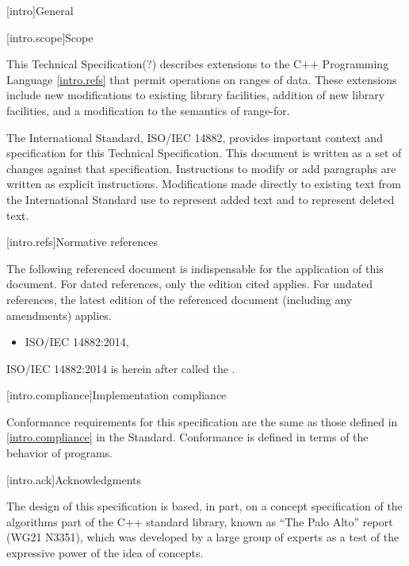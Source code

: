 
[intro]{General}

[intro.scope]{Scope}

\pnum
This Technical Specification(?) describes extensions to the C++
Programming Language \ref{intro.refs} that
permit operations on ranges of data. These extensions include
new modifications to existing library facilities, addition of
new library facilities, and a modification to the semantics of
range-for.

\pnum
The International Standard, ISO/IEC 14882, provides important context
and specification for this Technical Specification. This document is
written as a set of changes against that specification. Instructions
to modify or add paragraphs are written as explicit instructions.
Modifications made directly to existing text from the International
Standard use  to represent added text and
 to represent deleted text.


[intro.refs]{Normative references}

\pnum
The following referenced document is indispensable for the
application of this document. For dated references, only the
edition cited applies. For undated references, the latest edition
of the referenced document (including any amendments) applies.

\begin{itemize}
\item ISO/IEC 14882:2014, 
\end{itemize}

ISO/IEC 14882:2014 is herein after called the .

[intro.compliance]{Implementation compliance}

\pnum
Conformance requirements for this specification are the same as those
defined in \ref{intro.compliance} in the \Cpp Standard.
\enternote
Conformance is defined in terms of the behavior of programs.
\exitnote

[intro.ack]{Acknowledgments}

\pnum
The design of this specification is based, in part, on a concept
specification of the algorithms part of the C++ standard library, known
as ``The Palo Alto'' report (WG21 N3351), which was developed by a large
group of experts as a test of the expressive power of the idea of
concepts.
